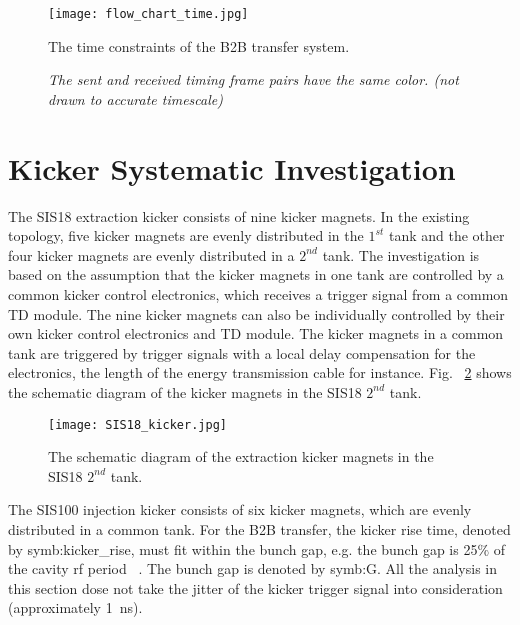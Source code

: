 \begin{landscape}
\begin{figure}[!htb]
   \centering   
   \texttt{[image: flow\_chart\_time.jpg]}
   \caption{The time constraints of the B2B transfer system.}
   \caption*{\textsl{\small{The sent and received timing frame pairs have the same color. (not drawn to accurate timescale) }}}
   \label{time_constraint}
\end{figure}
\end{landscape}

\section{Kicker Systematic Investigation}
\label{real_kicker}
The SIS18 extraction kicker consists of nine kicker magnets. In the existing topology, five kicker magnets are evenly distributed in the $1^{st}$ tank and the other four kicker magnets are evenly distributed in a $2^{nd}$ tank. The investigation is based on the assumption that the kicker magnets in one tank are controlled by a common kicker control electronics, which receives a trigger signal from a common TD module. The nine kicker magnets can also be individually controlled by their own kicker control electronics and TD module. The kicker magnets in a common tank are triggered by trigger signals with a local delay compensation for the electronics, the length of the energy transmission cable for instance. Fig. ~\ref{SIS18_kicker} shows the schematic diagram of the kicker magnets in the SIS18 $2^{nd}$ tank. 
\begin{figure}[H]
   \centering   
   \texttt{[image: SIS18\_kicker.jpg]}
   \caption{The schematic diagram of the extraction kicker magnets in the SIS18 $2^{nd}$ tank.}
   \label{SIS18_kicker}
\end{figure}

The SIS100 injection kicker consists of six kicker magnets, which are evenly distributed in a common tank. For the B2B transfer, the kicker rise time, denoted by \gls{symb:kicker_rise}, must fit within the bunch gap, e.g. the bunch gap is 25$\%$ of the cavity rf period ~\cite{blell_injection_2014, liebermann_sis100_2013}. The bunch gap is denoted by \gls{symb:G}.  All the analysis in this section dose not take the jitter of the kicker trigger signal into consideration (approximately \SI{1}{ns}). 

